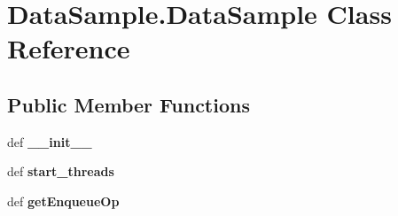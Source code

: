 \hypertarget{classDataSample_1_1DataSample}{\section{Data\-Sample.\-Data\-Sample Class Reference}
\label{classDataSample_1_1DataSample}
}
\subsection*{Public Member Functions}
\begin{DoxyCompactItemize}
\item 
\hypertarget{classDataSample_1_1DataSample_a94ba878e73df4d60f17581f71576f03c}{def {\bfseries \-\_\-\-\_\-init\-\_\-\-\_\-}}\label{classDataSample_1_1DataSample_a94ba878e73df4d60f17581f71576f03c}

\item 
\hypertarget{classDataSample_1_1DataSample_a21d87e9f6905da42dbddebbed7ad8cc7}{def {\bfseries start\-\_\-threads}}\label{classDataSample_1_1DataSample_a21d87e9f6905da42dbddebbed7ad8cc7}

\item 
\hypertarget{classDataSample_1_1DataSample_ad6f67ff2e39757b15a56491b439705e4}{def {\bfseries get\-Enqueue\-Op}}\label{classDataSample_1_1DataSample_ad6f67ff2e39757b15a56491b439705e4}

\end{DoxyCompactItemize}
